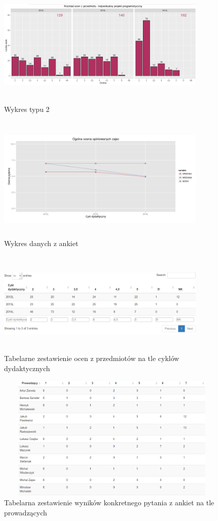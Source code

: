 \documentclass[]{article}
\begin{document}
\begin{figure}[H]
	\centering
	\includegraphics[width=100mm,height=60mm]
	{obrazki/wykres-oceny-wiele.png}
	\caption{Wykres typu 2}
	\label{wykres_osobno}
\end{figure}

\begin{figure}[H]
	\centering
	\includegraphics[width=100mm, height=60mm]{obrazki/wykres-ankieta.png}
	\caption{Wykres danych z ankiet}
	\label{wykres_ankiet}
\end{figure}

\begin{figure}[H]
	\centering
	\includegraphics[width=100mm, height=50mm]{obrazki/oceny_tabela.png}
	\caption{Tabelarne zestawienie ocen z przedmiotów na tle cyklów dydaktycznych}
	\label{tabela_oceny}
\end{figure}

\begin{figure}[H]
	\centering
	\includegraphics[width=120mm, height=60mm]{obrazki/oceny-tabela.png}
	\caption{Tabelarna zestawienie wyników konkretnego pytania z ankiet na tle prowadzących}
	\label{tabela_ankiety}
\end{figure}
\end{document}
